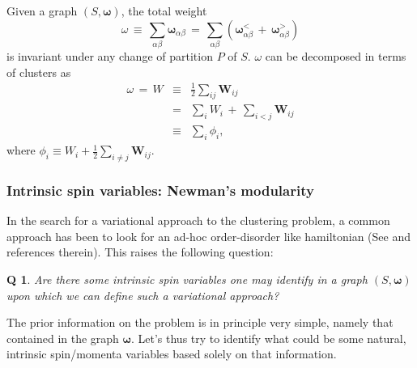 \documentclass[twocolumn,aps,sort,nofootinbib]{revtex4}
\newtheorem{question}{Q}
\begin{document}
Given a graph $(S,\boldsymbol{\omega})$, the total
weight 
\begin{equation}
\omega\,\equiv\,\sum_{\alpha\beta}\boldsymbol{\omega}_{\alpha\beta}
\,=\,\sum_{\alpha\beta}\left(\boldsymbol{\omega}^<_{\alpha\beta}\,+\,\boldsymbol{\omega}^>_{\alpha\beta}\right)
\label{TotalWeightEdges}
\end{equation}
is invariant under any change of partition $P$ of $S$.
$\omega$ can be decomposed in terms of clusters as
\begin{eqnarray}
\omega\,=\,W &\equiv & \frac{1}{2}\sum_{ij}\boldsymbol{W}_{ij} \nonumber \\
&=& \sum_iW_i\,+\,\sum_{i<j}\boldsymbol{W}_{ij} \nonumber \\
&\equiv & \sum_i \phi_i,
\label{TotalWeightClusters}
\end{eqnarray}
where $\phi_i \equiv W_i + \frac{1}{2}\sum_{i\neq j} \boldsymbol{W}_{ij}$. 

\subsubsection{Intrinsic spin variables: Newman's modularity}
In the search for a variational approach to the clustering problem,
a common approach has been to look for an ad-hoc 
order-disorder like hamiltonian 
(See \cite{Blatt96,Shai98,Reichardt06} and references therein). 
This raises the following question:
\begin{question}
Are there some intrinsic {\em spin} variables one may identify in
a graph $(S,\boldsymbol{\omega})$ upon which we can define such
a variational approach?  
\end{question}
The prior information on the problem is in principle very simple, namely that
contained in the graph $\boldsymbol{\omega}$. 
Let's thus try to identify what could be some natural, intrinsic 
spin/momenta variables based solely on that information.
\end{document}
